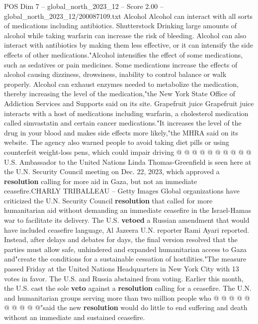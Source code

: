 \begin{textsample}{POS Dim 7 – global\_north\_2023\_12 – Score 2.00 – global\_north\_2023\_12/200087109.txt}  \label{ex:f7_pos_307}
Alcohol Alcohol can interact with all sorts of medications including antibiotics.
Shutterstock Drinking large amounts of alcohol while taking warfarin can increase the risk of bleeding.
Alcohol can also interact with antibiotics by making them less effective, or it can intensify the side effects of other medications."Alcohol intensifies the effect of some medications, such as sedatives or pain medicines.
Some medications increase the effects of alcohol causing dizziness, drowsiness, inability to control balance or walk properly.
Alcohol can exhaust enzymes needed to metabolize the medication, thereby increasing the level of the medication,"the New York State Office of Addiction Services and Supports said on its site.
Grapefruit juice Grapefruit juice interacts with a host of medications including warfarin, a cholesterol medication called simvastatin and certain cancer medications."It increases the level of the drug in your blood and makes side effects more likely,"the MHRA said on its website.
The agency also warned people to avoid taking diet pills or using counterfeit weight-loss pens, which could impair driving @ @ @ @ @ @ @ @ @ @ U.S.
Ambassador to the United Nations Linda Thomas-Greenfield is seen here at the U.N.
Security Council meeting on Dec. 22, 2023, which approved a \textbf{resolution} calling for more aid in Gaza, but not an immediate ceasefire.CHARLY TRIBALLEAU -- Getty Images Global organizations have criticized the U.N.
Security Council \textbf{resolution} that called for more humanitarian aid without demanding an immediate ceasefire in the Israel-Hamas war to facilitate its delivery.
The U.S. \textbf{vetoed} a Russian amendment that would have included ceasefire language, Al Jazeera U.N. reporter Rami Ayari reported.
Instead, after delays and debates for days, the final version resolved that the parties must allow safe, unhindered and expanded humanitarian access to Gaza and"create the conditions for a sustainable cessation of hostilities."The measure passed Friday at the United Nations Headquarters in New York City with 13 votes in favor.
The U.S. and Russia abstained from voting.
Earlier this month, the U.S. cast the sole \textbf{veto} against a \textbf{resolution} calling for a ceasefire.
The U.N. and humanitarian groups serving more than two million people who @ @ @ @ @ @ @ @ @ @"said the new \textbf{resolution} would do little to end suffering and death without an immediate and sustained ceasefire.

\end{textsample}
